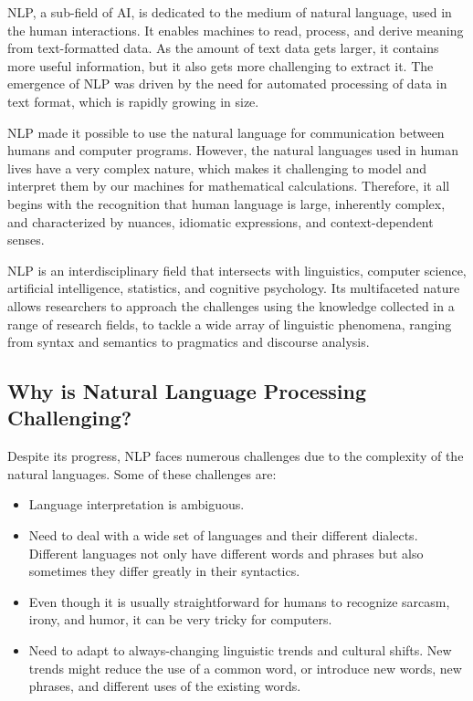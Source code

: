 
\ac{NLP}, a sub-field of \ac{AI}, is dedicated to the medium of natural language, used in the human interactions. It enables machines to read, process, and derive meaning from text-formatted data. As the amount of text data gets larger, it contains more useful information, but it also gets more challenging to extract it. The emergence of \ac{NLP} was driven by the need for automated processing of data in text format, which is rapidly growing in size. 

\ac{NLP} made it possible to use the natural language for communication between humans and computer programs.  However, the natural languages used in human lives have a very complex nature, which makes it challenging to model and interpret them by our machines for mathematical calculations. Therefore, it all begins with the recognition that human language is large, inherently complex, and characterized by nuances, idiomatic expressions, and context-dependent senses.

\ac{NLP} is an interdisciplinary field that intersects with linguistics, computer science, artificial intelligence, statistics, and cognitive psychology. Its multifaceted nature allows researchers to approach the challenges using the knowledge collected in a range of research fields, to tackle a wide array of linguistic phenomena, ranging from syntax and semantics to pragmatics and discourse analysis.


\subsection{Why is Natural Language Processing Challenging?}
Despite its progress, \ac{NLP} faces numerous challenges due to the complexity of the natural languages. Some of these challenges are:

\begin{itemize}
\item Language interpretation is ambiguous.
\item Need to deal with a wide set of languages and their different dialects. Different languages not only have different words and phrases but also sometimes they differ greatly in their syntactics.
\item Even though it is usually straightforward for humans to recognize sarcasm, irony, and humor, it can be very tricky for computers.
\item Need to adapt to always-changing linguistic trends and cultural shifts. New trends might reduce the use of a common word, or introduce new words, new phrases, and different uses of the existing words.
\end{itemize}

